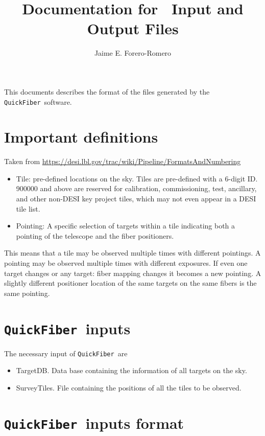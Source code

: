 \documentclass{article}
\title{Documentation for \code\ Input and Output Files}
\author{Jaime E. Forero-Romero}
\newcommand{\code}{{\texttt{QuickFiber}}}
\begin{document}
\maketitle
\tableofcontents 

\vspace{1cm}
This documents describes the format of the files generated by the
\code\ software.  

\section{Important definitions}
Taken from \url{https://desi.lbl.gov/trac/wiki/Pipeline/FormatsAndNumbering}
\begin{itemize}

  \item Tile: pre-defined locations on the sky. Tiles are pre-defined
    with a 6-digit ID. 900000 and above are reserved for calibration,
    commissioning, test, ancillary, and other non-DESI key project
    tiles, which may not even appear in a DESI tile list.  
  \item Pointing: A specific
    selection of targets within a tile indicating both a pointing of the
    telescope and the fiber positioners.  
\end{itemize}

This means that a tile may be observed
multiple times with different pointings. A pointing may be observed
multiple times with different exposures. If even one target changes
or any target: fiber mapping changes it becomes a new pointing. A
slightly different positioner location of the same targets on the
same fibers is the same pointing.  

\section{\code\ inputs}
The necessary input of \code\ are 
\begin{itemize}
\item TargetDB. Data base containing the information of all targets on the sky. 
\item SurveyTiles. File containing the positions of all the tiles to be observed.
\end{itemize}



\section{\code\ inputs format}
\end{document}
